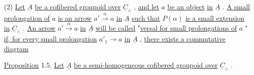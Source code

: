         (2)  \underline{Let}  $\underline{A}$  \underline{be a cofibered groupoid over}  $\underline{C}_{\wedge}$ , \underline{and let}  $a$  \underline{be an object}
\underline{in}  $\underline{A}$ . \underline{A small prolongation of}  $a$  \underline{is an arrow}  $a' \xrightarrow{\ \alpha\ } a$  \underline{in}  $\underline{A}$  \underline{such that}
$P(\alpha)$  \underline{is a small extension in}  $\underline{C}_{\wedge}$ . \underline{An arrow}  $a' \xrightarrow{\ \alpha\ } a$  \underline{in}  $\underline{A}$  \underline{will be called}
"\underline{versal for small prolongations of}  $a$  "  \underline{if, for every small prolongation}
$a'_{1} \longrightarrow a$  \underline{in}  $\underline{A}$ , \underline{there exists a commutative diagram}

\begin{center}
\end{center}
\underline{Proposition} 1.5.    \underline{Let}  $\underline{A}$  \underline{be a semi-homogeneous cofibered groupoid over}  $\underline{C}_{\wedge}$ .

